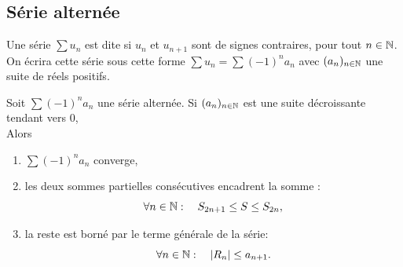 \documentclass{book}
\begin{document}
\subsection{Série alternée}

\begin{Definition}[Alternée]
Une série $\sum u_n$ est dite  si $u_n$ et $u_{n+1}$ sont de signes contraires, pour tout $n\in\mathbb{N}$.\\
On écrira cette série sous cette forme $\sum u_n =\sum (-1)^n a_n$ avec $(a_n)_{n\in\mathbb{N}}$ une suite de réels positifs. 
\end{Definition}
\begin{Theoreme}
Soit $\sum (-1)^n a_n$ une série alternée. Si  $(a_n)_{n\in\mathbb{N}}$ est une suite décroissante tendant vers $0$,\\
Alors
\begin{enumerate}
\item  $\sum (-1)^n a_n$ converge,
\item  les deux sommes partielles consécutives encadrent la somme : $$\forall n\in \mathbb{N} : \quad  S_{2n+1}\leq S \leq S_{2n},$$
\item  la reste est borné par le terme générale de la série: $$\forall n\in \mathbb{N} : \quad  |R_n|\leq a_{n+1}.$$
\end{enumerate}
\end{Theoreme}
\end{document}

